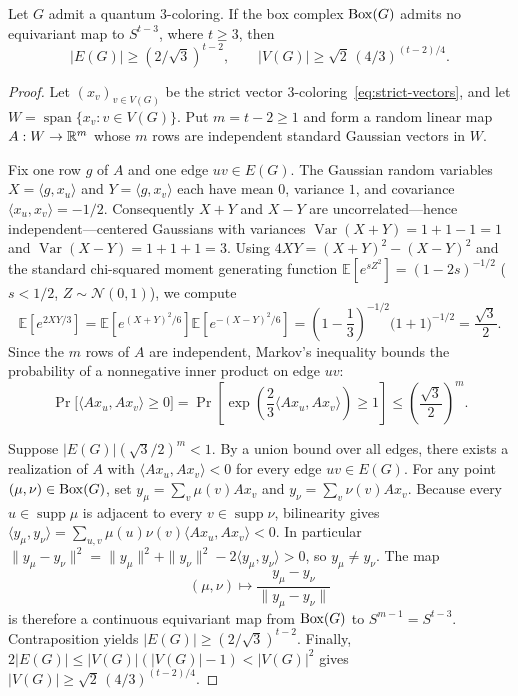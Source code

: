\begin{proposition}\label{prop:box-barrier}
Let $G$ admit a quantum $3$-coloring. If the box complex $\operatorname{Box}(G)$ admits no equivariant map to $S^{t-3}$, where $t\ge3$, then
\[
 |E(G)|\ge(2/\sqrt3)^{t-2},\qquad |V(G)|\ge\sqrt2\,(4/3)^{(t-2)/4}.
\]
\end{proposition}
\begin{proof}
Let $(x_v)_{v\in V(G)}$ be the strict vector $3$-coloring~\eqref{eq:strict-vectors}, and let $W=\operatorname{span}\{x_v:v\in V(G)\}$. Put $m=t-2\ge1$ and form a random linear map $A:W\to\mathbb R^m$ whose $m$ rows are independent standard Gaussian vectors in $W$.

Fix one row $g$ of $A$ and one edge $uv\in E(G)$. The Gaussian random variables $X=\langle g,x_u\rangle$ and $Y=\langle g,x_v\rangle$ each have mean $0$, variance $1$, and covariance $\langle x_u,x_v\rangle=-1/2$. Consequently $X+Y$ and $X-Y$ are uncorrelated---hence independent---centered Gaussians with variances $\operatorname{Var}(X+Y)=1+1-1=1$ and $\operatorname{Var}(X-Y)=1+1+1=3$. Using $4XY=(X+Y)^2-(X-Y)^2$ and the standard chi-squared moment generating function $\mathbb E[e^{sZ^2}]=(1-2s)^{-1/2}$ ($s<1/2$, $Z\sim\mathcal N(0,1)$), we compute
\[
 \mathbb E\!\left[e^{2XY/3}\right]
 =\mathbb E\!\left[e^{(X+Y)^2/6}\right]\mathbb E\!\left[e^{-(X-Y)^2/6}\right]
 =\left(1-\frac13\right)^{-1/2}\bigl(1+1\bigr)^{-1/2}=\frac{\sqrt3}{2}.
\]
Since the $m$ rows of $A$ are independent, Markov's inequality bounds the probability of a nonnegative inner product on edge $uv$:
\[
 \Pr\bigl[\langle Ax_u,Ax_v\rangle\ge0\bigr]
 =\Pr\!\left[\exp\!\left(\frac23\langle Ax_u,Ax_v\rangle\right)\ge1\right]
 \le \left(\frac{\sqrt3}{2}\right)^m.
\]

Suppose $|E(G)|(\sqrt3/2)^m<1$. By a union bound over all edges, there exists a realization of $A$ with $\langle Ax_u,Ax_v\rangle<0$ for every edge $uv\in E(G)$. For any point $(\mu,\nu)\in\operatorname{Box}(G)$, set $y_\mu=\sum_v \mu(v)Ax_v$ and $y_\nu=\sum_v \nu(v)Ax_v$. Because every $u\in\operatorname{supp}\mu$ is adjacent to every $v\in\operatorname{supp}\nu$, bilinearity gives $\langle y_\mu,y_\nu\rangle=\sum_{u,v}\mu(u)\nu(v)\langle Ax_u,Ax_v\rangle<0$. In particular $\|y_\mu-y_\nu\|^2=\|y_\mu\|^2+\|y_\nu\|^2-2\langle y_\mu,y_\nu\rangle>0$, so $y_\mu\ne y_\nu$. The map
\[
 (\mu,\nu)\longmapsto \frac{y_\mu-y_\nu}{\|y_\mu-y_\nu\|}
\]
is therefore a continuous equivariant map from $\operatorname{Box}(G)$ to $S^{m-1}=S^{t-3}$. Contraposition yields $|E(G)|\ge(2/\sqrt3)^{t-2}$. Finally, $2|E(G)|\le|V(G)|(|V(G)|-1)<|V(G)|^2$ gives $|V(G)|\ge\sqrt2\,(4/3)^{(t-2)/4}$.
\end{proof}

